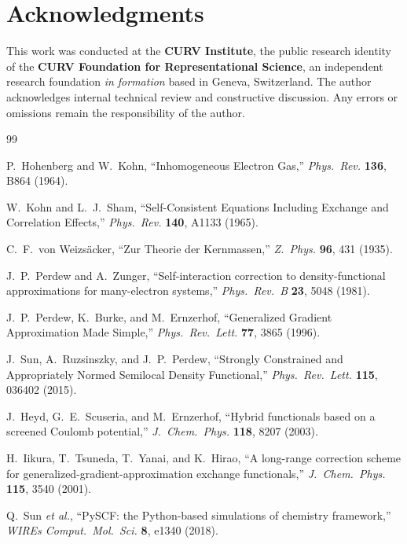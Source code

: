 \documentclass[11pt]{article}
\begin{document}
\section*{Acknowledgments}

This work was conducted at the \textbf{CURV Institute}, the public research identity of the \textbf{CURV Foundation for Representational Science}, an independent research foundation \textit{in formation} based in Geneva, Switzerland. The author acknowledges internal technical review and constructive discussion. Any errors or omissions remain the responsibility of the author.

\begin{thebibliography}{99}

P.~Hohenberg and W.~Kohn,
``Inhomogeneous Electron Gas,''
\emph{Phys.\ Rev.} \textbf{136}, B864 (1964).

W.~Kohn and L.~J.~Sham,
``Self-Consistent Equations Including Exchange and Correlation Effects,''
\emph{Phys.\ Rev.} \textbf{140}, A1133 (1965).

C.~F.~von Weizs\"acker,
``Zur Theorie der Kernmassen,''
\emph{Z.\ Phys.} \textbf{96}, 431 (1935).

J.~P.~Perdew and A.~Zunger,
``Self-interaction correction to density-functional approximations for many-electron systems,''
\emph{Phys.\ Rev.\ B} \textbf{23}, 5048 (1981).

J.~P.~Perdew, K.~Burke, and M.~Ernzerhof,
``Generalized Gradient Approximation Made Simple,''
\emph{Phys.\ Rev.\ Lett.} \textbf{77}, 3865 (1996).

J.~Sun, A.~Ruzsinszky, and J.~P.~Perdew,
``Strongly Constrained and Appropriately Normed Semilocal Density Functional,''
\emph{Phys.\ Rev.\ Lett.} \textbf{115}, 036402 (2015).

J.~Heyd, G.~E.~Scuseria, and M.~Ernzerhof,
``Hybrid functionals based on a screened Coulomb potential,''
\emph{J.\ Chem.\ Phys.} \textbf{118}, 8207 (2003).

H.~Iikura, T.~Tsuneda, T.~Yanai, and K.~Hirao,
``A long-range correction scheme for generalized-gradient-approximation exchange functionals,''
\emph{J.\ Chem.\ Phys.} \textbf{115}, 3540 (2001).

Q.~Sun \emph{et al.},
``PySCF: the Python-based simulations of chemistry framework,''
\emph{WIREs Comput.\ Mol.\ Sci.} \textbf{8}, e1340 (2018).

\end{thebibliography}
\end{document}
